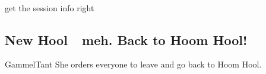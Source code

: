 \

\todo get the session info right






\vspace{30mm}


\vspace{30mm}








\subsection*{New Hool~\mdash~meh. Back to Hoom Hool!}

GammelTant
She orders everyone to leave and go back to Hoom Hool.




\vspace{50mm}




